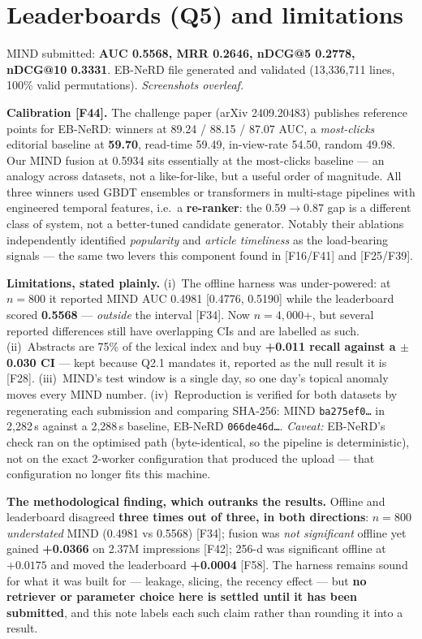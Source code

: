 \documentclass[10pt,a4paper]{article}
\newcommand{\F}[1]{\textcolor{blue!55!black}{\footnotesize[#1]}}
\begin{document}
\section{Leaderboards (Q5) and limitations}

MIND submitted: \textbf{AUC 0.5568, MRR 0.2646, nDCG@5 0.2778, nDCG@10 0.3331}. EB-NeRD file
generated and validated (13,336,711 lines, 100\% valid permutations). \emph{Screenshots overleaf.}

\textbf{Calibration \F{F44}.} The challenge paper (arXiv 2409.20483) publishes reference points for
EB-NeRD: winners at 89.24 / 88.15 / 87.07 AUC, a \emph{most-clicks} editorial baseline at
\textbf{59.70}, read-time 59.49, in-view-rate 54.50, random 49.98. Our MIND fusion at 0.5934 sits
essentially at the most-clicks baseline --- an analogy across datasets, not a like-for-like, but a
useful order of magnitude. All three winners used GBDT ensembles or transformers in multi-stage
pipelines with engineered temporal features, i.e.\ a \textbf{re-ranker}: the 0.59$\rightarrow$0.87
gap is a different class of system, not a better-tuned candidate generator. Notably their ablations
independently identified \emph{popularity} and \emph{article timeliness} as the load-bearing
signals --- the same two levers this component found in \F{F16/F41} and \F{F25/F39}.

\textbf{Limitations, stated plainly.} (i)~The offline harness was under-powered: at $n{=}800$ it
reported MIND AUC 0.4981 [0.4776, 0.5190] while the leaderboard scored \textbf{0.5568} ---
\emph{outside} the interval \F{F34}. Now $n{=}4{,}000$+, but several reported differences still have
overlapping CIs and are labelled as such. (ii)~Abstracts are 75\% of the lexical index and buy
\textbf{+0.011 recall against a $\pm$0.030 CI} --- kept because Q2.1 mandates it, reported as the
null result it is \F{F28}. (iii)~MIND's test window is a single day, so one day's topical anomaly
moves every MIND number. (iv)~Reproduction is verified for both datasets by regenerating each
submission and comparing SHA-256: MIND \texttt{ba275ef0\ldots} in 2{,}282\,s against a 2{,}288\,s
baseline, EB-NeRD \texttt{066de46d\ldots}. \emph{Caveat:} EB-NeRD's check ran on the optimised path
(byte-identical, so the pipeline is deterministic), not on the exact 2-worker configuration that
produced the upload --- that configuration no longer fits this machine.

\textbf{The methodological finding, which outranks the results.} Offline and leaderboard disagreed
\textbf{three times out of three, in both directions}: $n{=}800$ \emph{understated} MIND
(0.4981 vs 0.5568) \F{F34}; fusion was \emph{not significant} offline yet gained \textbf{+0.0366}
on 2.37M impressions \F{F42}; 256-d was significant offline at $+0.0175$ and moved the leaderboard
\textbf{+0.0004} \F{F58}. The harness remains sound for what it was built for --- leakage, slicing,
the recency effect --- but \textbf{no retriever or parameter choice here is settled until it has
been submitted}, and this note labels each such claim rather than rounding it into a result.
\end{document}
